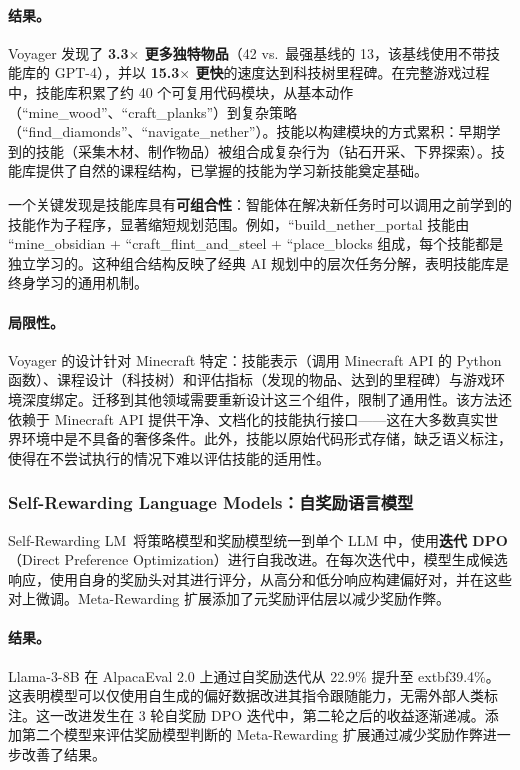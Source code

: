 \paragraph{结果。}
Voyager 发现了 \textbf{3.3$\times$ 更多独特物品}（42 vs.\ 最强基线的 13，该基线使用不带技能库的 GPT-4），并以 \textbf{15.3$\times$ 更快}的速度达到科技树里程碑。在完整游戏过程中，技能库积累了约 40 个可复用代码模块，从基本动作（``mine\_wood''、``craft\_planks''）到复杂策略（``find\_diamonds''、``navigate\_nether''）。技能以构建模块的方式累积：早期学到的技能（采集木材、制作物品）被组合成复杂行为（钻石开采、下界探索）。技能库提供了自然的课程结构，已掌握的技能为学习新技能奠定基础。

一个关键发现是技能库具有\textbf{可组合性}：智能体在解决新任务时可以调用之前学到的技能作为子程序，显著缩短规划范围。例如，``build\_nether\_portal 技能由 ``mine\_obsidian + ``craft\_flint\_and\_steel + ``place\_blocks 组成，每个技能都是独立学习的。这种组合结构反映了经典 AI 规划中的层次任务分解，表明技能库是终身学习的通用机制。

\paragraph{局限性。}
Voyager 的设计针对 Minecraft 特定：技能表示（调用 Minecraft API 的 Python 函数）、课程设计（科技树）和评估指标（发现的物品、达到的里程碑）与游戏环境深度绑定。迁移到其他领域需要重新设计这三个组件，限制了通用性。该方法还依赖于 Minecraft API 提供干净、文档化的技能执行接口——这在大多数真实世界环境中是不具备的奢侈条件。此外，技能以原始代码形式存储，缺乏语义标注，使得在不尝试执行的情况下难以评估技能的适用性。


\subsubsection{Self-Rewarding Language Models：自奖励语言模型}

Self-Rewarding LM~\citep{selfrewarding2024}将策略模型和奖励模型统一到单个 LLM 中，使用\textbf{迭代 DPO}（Direct Preference Optimization）进行自我改进。在每次迭代中，模型生成候选响应，使用自身的奖励头对其进行评分，从高分和低分响应构建偏好对，并在这些对上微调。Meta-Rewarding 扩展添加了元奖励评估层以减少奖励作弊。

\paragraph{结果。}
Llama-3-8B 在 AlpacaEval 2.0 上通过自奖励迭代从 22.9\% 提升至 	extbf{39.4\%}。这表明模型可以仅使用自生成的偏好数据改进其指令跟随能力，无需外部人类标注。这一改进发生在 3 轮自奖励 DPO 迭代中，第二轮之后的收益逐渐递减。添加第二个模型来评估奖励模型判断的 Meta-Rewarding 扩展通过减少奖励作弊进一步改善了结果。

